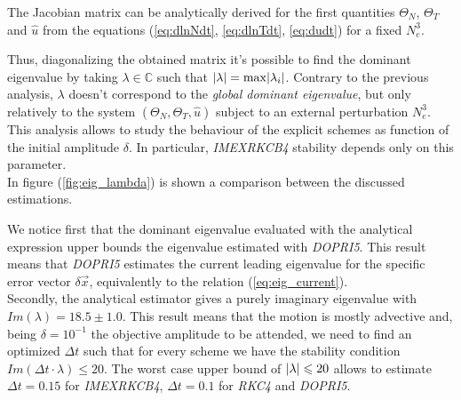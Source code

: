 \documentclass[final]{jpp}
\DeclarePairedDelimiter\abs{\lvert}{\rvert}
\begin{document}
The Jacobian matrix can be analytically derived for the first quantities $\Theta_N$, $\Theta_T$ and $\hat{u}$ from the equations (\ref{eq:dlnNdt}, \ref{eq:dlnTdt}, \ref{eq:dudt}) for a fixed $N_e^3$. 

\begin{minipage}{\textwidth}
\begin{minipage}{0.48\textwidth}
Thus, diagonalizing the obtained matrix it's possible to find the dominant eigenvalue by taking $\lambda \in \mathbb{C}$ such that $\abs{\lambda} = \max\abs{\lambda_i}$. Contrary to the previous analysis, $\lambda$ doesn't correspond to the \textit{global dominant eigenvalue}, but only relatively to the system $(\Theta_N, \Theta_T, \hat{u})$ subject to an external perturbation $N_e^3$.
\\
This analysis allows to study the behaviour of the explicit schemes as function of the initial amplitude $\delta$. In particular, \textit{IMEXRKCB4} stability depends only on this parameter.
\\
In figure (\ref{fig:eig_lambda}) is shown a comparison between the discussed estimations. 
\end{minipage}
\hspace{0.04\textwidth}
\begin{minipage}{0.48\textwidth}
\resizebox{\textwidth}{!}{
    
}
\label{fig:eig_lambda}
\end{minipage}
\vspace{0.5cm}
\end{minipage}

We notice first that the dominant eigenvalue evaluated with the analytical expression upper bounds the eigenvalue estimated with \textit{DOPRI5}. This result means that \textit{DOPRI5} estimates the current leading eigenvalue for the specific error vector $\delta \vec{x}$, equivalently to the relation (\ref{eq:eig_current}). 
\\
Secondly, the analytical estimator gives a purely imaginary eigenvalue with $Im(\lambda) = 18.5 \pm 1.0$. This result means that the motion is mostly advective and, being $\delta = 10^{-1}$ the objective amplitude to be attended, we need to find an optimized $\Delta t$ such that for every scheme we have the stability condition $Im(\Delta t \cdot \lambda) \le 20$. The worst case upper bound of $\abs{\lambda} \le 20$ allows to estimate $\Delta t = 0.15$ for \textit{IMEXRKCB4}, $\Delta t = 0.1$ for \textit{RKC4} and \textit{DOPRI5}.
\end{document}
